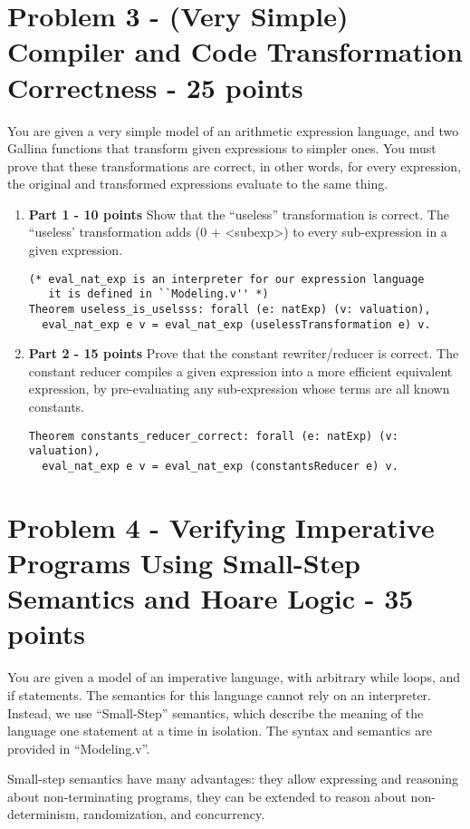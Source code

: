 \documentclass{article}
\begin{document}
\section{Problem 3 - (Very Simple) Compiler and Code Transformation Correctness - 25 points}
You are given a very simple model of an arithmetic expression language, and two Gallina functions that transform given expressions to simpler ones.
You must prove that these transformations are correct, in other words, for every expression, the original and transformed expressions evaluate to
the same thing. \\
\begin{enumerate}
\item \textbf{Part 1 - 10 points} Show that the ``useless'' transformation is correct. The ``useless' transformation adds (0 + <subexp>) to every sub-expression in a given expression.
\begin{verbatim}
(* eval_nat_exp is an interpreter for our expression language
   it is defined in ``Modeling.v'' *)
Theorem useless_is_uselsss: forall (e: natExp) (v: valuation),
  eval_nat_exp e v = eval_nat_exp (uselessTransformation e) v.
\end{verbatim}

\item \textbf{Part 2 - 15 points} Prove that the constant rewriter/reducer is correct. The constant reducer compiles a given expression into a more efficient equivalent
expression, by pre-evaluating any sub-expression whose terms are all known constants.
\begin{verbatim}
Theorem constants_reducer_correct: forall (e: natExp) (v: valuation),
  eval_nat_exp e v = eval_nat_exp (constantsReducer e) v.
\end{verbatim}
\end{enumerate}

\section {Problem 4 - Verifying Imperative Programs Using Small-Step Semantics and Hoare Logic - 35 points}
You are given a model of an imperative language, with arbitrary while loops, and if statements. The semantics
for this language cannot rely on an interpreter. Instead, we use ``Small-Step'' semantics, which describe the meaning
of the language one statement at a time in isolation. The syntax and semantics are provided in ``Modeling.v''.

Small-step semantics have many advantages: they allow expressing and reasoning about non-terminating programs, they
can be extended to reason about non-determinism, randomization, and concurrency.
\end{document}
